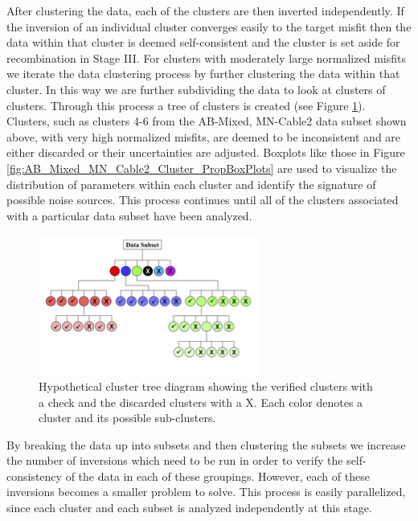 \documentclass[final,authoryear,5p,times,twocolumn]{elsarticle}
\begin{document}
After clustering the data, each of the clusters are then inverted independently. If the inversion of an individual cluster converges easily to the target misfit then the data within that cluster is deemed self-consistent and the cluster is set aside for recombination in Stage III. For clusters with moderately large normalized misfits we iterate the data clustering process by further clustering the data within that cluster. In this way we are further subdividing the data to look at clusters of clusters. Through this process a tree of clusters is created (see Figure \ref{fig:ClusterTree}). Clusters, such as clusters 4-6 from the AB-Mixed, MN-Cable2 data subset shown above, with very high normalized misfits, are deemed to be inconsistent and are either discarded or their uncertainties are adjusted. Boxplots like those in Figure \ref{fig:AB_Mixed_MN_Cable2_Cluster_PropBoxPlots} are used to visualize the distribution of parameters within each cluster and identify the signature of possible noise sources. This process continues until all of the clusters associated with a particular data subset have been analyzed.

\begin{figure} [h!]
\begin{center}
   \includegraphics[trim=0cm 0cm 0cm 0cm, clip=true,width=0.75\linewidth]{./Figures/Fig14.png}
\end{center}
\caption{Hypothetical cluster tree diagram showing the verified clusters with a check and the discarded clusters with a X. Each color denotes a cluster and its possible sub-clusters.}
\label{fig:ClusterTree}
\end{figure}

By breaking the data up into subsets and then clustering the subsets we increase the number of inversions which need to be run in order to verify the self-consistency of the data in each of these groupings. However, each of these inversions becomes a smaller problem to solve. This process is easily parallelized, since each cluster and each subset is analyzed independently at this stage.
\end{document}
